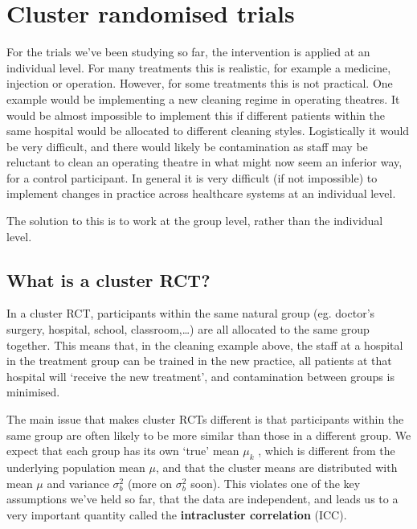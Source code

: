 \documentclass[
  openany]{book}
\theoremstyle{definition}
\theoremstyle{definition}
\theoremstyle{definition}
\theoremstyle{definition}
\theoremstyle{remark}
\begin{document}
\hypertarget{cluster-rct}{%
\chapter{Cluster randomised trials}\label{cluster-rct}}

For the trials we've been studying so far, the intervention is applied at an individual level. For many treatments this is realistic, for example a medicine, injection or operation. However, for some treatments this is not practical. One example would be implementing a new cleaning regime in operating theatres. It would be almost impossible to implement this if different patients within the same hospital would be allocated to different cleaning styles. Logistically it would be very difficult, and there would likely be contamination as staff may be reluctant to clean an operating theatre in what might now seem an inferior way, for a control participant. In general it is very difficult (if not impossible) to implement changes in practice across healthcare systems at an individual level.

The solution to this is to work at the group level, rather than the individual level.

\hypertarget{what-is-a-cluster-rct}{%
\section{What is a cluster RCT?}\label{what-is-a-cluster-rct}}

In a cluster RCT, participants within the same natural group (eg. doctor's surgery, hospital, school, classroom,\ldots) are all allocated to the same group together. This means that, in the cleaning example above, the staff at a hospital in the treatment group can be trained in the new practice, all patients at that hospital will `receive the new treatment', and contamination between groups is minimised.

The main issue that makes cluster RCTs different is that participants within the same group are often likely to be more similar than those in a different group. We expect that each group has its own `true' mean \(\mu_k\) , which is different from the underlying population mean \(\mu\), and that the cluster means are distributed with mean \(\mu\) and variance \(\sigma^2_b\) (more on \(\sigma^2_b\) soon). This violates one of the key assumptions we've held so far, that the data are independent, and leads us to a very important quantity called the \textbf{intracluster correlation} (ICC).
\end{document}
